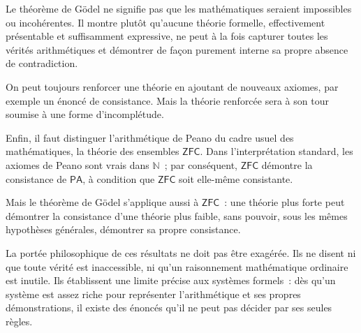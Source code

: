 \thingy
Le théorème de Gödel ne signifie pas que les mathématiques seraient
impossibles ou incohérentes.  Il montre plutôt qu'aucune théorie
formelle, effectivement présentable et suffisamment expressive, ne peut
à la fois capturer toutes les vérités arithmétiques et démontrer de façon
purement interne sa propre absence de contradiction.

On peut toujours renforcer une théorie en ajoutant de nouveaux axiomes,
par exemple un énoncé de consistance.  Mais la théorie renforcée sera à
son tour soumise à une forme d'incomplétude.

\thingy
Enfin, il faut distinguer l'arithmétique de Peano du cadre usuel des
mathématiques, la théorie des ensembles $\mathsf{ZFC}$.  Dans
l'interprétation standard, les axiomes de Peano sont vrais dans
$\mathbb{N}$ ; par conséquent, $\mathsf{ZFC}$ démontre la consistance de
$\mathsf{PA}$, à condition que $\mathsf{ZFC}$ soit elle-même
consistante.

Mais le théorème de Gödel s'applique aussi à $\mathsf{ZFC}$ : une théorie
plus forte peut démontrer la consistance d'une théorie plus faible, sans
pouvoir, sous les mêmes hypothèses générales, démontrer sa propre
consistance.

\thingy
La portée philosophique de ces résultats ne doit pas être exagérée.  Ils
ne disent ni que toute vérité est inaccessible, ni qu'un raisonnement
mathématique ordinaire est inutile.  Ils établissent une limite précise
aux systèmes formels : dès qu'un système est assez riche pour représenter
l'arithmétique et ses propres démonstrations, il existe des énoncés qu'il
ne peut pas décider par ses seules règles.

